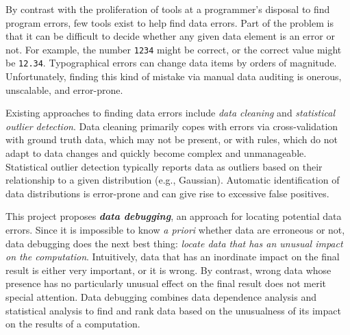 


By contrast with the proliferation of tools at a programmer's disposal
to find program errors, few tools exist to help find data errors. Part
of the problem is that it can be difficult to decide whether any given
data element is an error or not. For example, the number \texttt{1234}
might be correct, or the correct value might
be \texttt{12.34}. Typographical errors can change data items by
orders of magnitude. Unfortunately, finding this kind of mistake via
manual data auditing is onerous, unscalable, and error-prone.




Existing approaches to finding data errors include
\emph{data cleaning} and  \emph{statistical outlier detection}.
Data cleaning primarily copes with errors via
cross-validation with ground truth data, which may not be
present, or with rules, which do not adapt to data changes and quickly become complex and unmanageable. Statistical outlier detection typically reports data as
outliers based on their relationship to a given distribution (e.g.,
Gaussian).  Automatic identification of data distributions is
error-prone and can give rise to excessive false positives.



This project proposes \emph{\bf data debugging}, an approach for locating
potential data errors. Since it is impossible to know \emph{a priori}
whether data are erroneous or not, data debugging does the next best
thing: \emph{locate data that has an unusual
impact on the computation}. Intuitively, data that has an inordinate impact on the final
result is either very important, or it is wrong. By contrast, wrong
data whose presence has no particularly unusual effect on the final result does not
merit special attention.  Data debugging combines data dependence
analysis and statistical analysis to find and rank data based on the unusualness of its
impact on the results of a computation.

